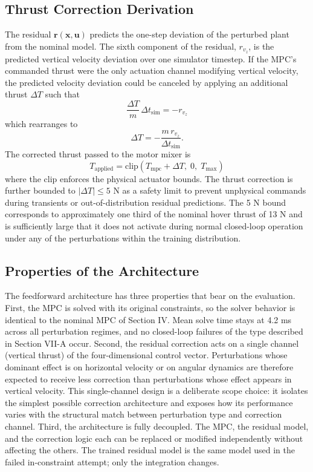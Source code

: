 \documentclass[conference]{IEEEtran}
\begin{document}
\subsection{Thrust Correction Derivation}
The residual $\mathbf{r}(\mathbf{x}, \mathbf{u})$ predicts the one-step deviation of the perturbed plant from the nominal model. The sixth component of the residual, $r_{v_z}$, is the predicted vertical velocity deviation over one simulator timestep. If the MPC's commanded thrust were the only actuation channel modifying vertical velocity, the predicted velocity deviation could be canceled by applying an additional thrust $\Delta T$ such that
\begin{equation}
\frac{\Delta T}{m}\, \Delta t_{\text{sim}} = -r_{v_z}
\end{equation}
which rearranges to
\begin{equation}
\Delta T = -\frac{m\, r_{v_z}}{\Delta t_{\text{sim}}}.
\end{equation}
The corrected thrust passed to the motor mixer is
\begin{equation}
T_{\text{applied}} = \mathrm{clip}\!\left(T_{\text{mpc}} + \Delta T,\; 0,\; T_{\max}\right)
\end{equation}
where the clip enforces the physical actuator bounds. The thrust correction is further bounded to $|\Delta T| \leq 5$ N as a safety limit to prevent unphysical commands during transients or out-of-distribution residual predictions. The 5 N bound corresponds to approximately one third of the nominal hover thrust of 13 N and is sufficiently large that it does not activate during normal closed-loop operation under any of the perturbations within the training distribution.

\subsection{Properties of the Architecture}
The feedforward architecture has three properties that bear on the evaluation. First, the MPC is solved with its original constraints, so the solver behavior is identical to the nominal MPC of Section IV. Mean solve time stays at 4.2 ms across all perturbation regimes, and no closed-loop failures of the type described in Section VII-A occur. Second, the residual correction acts on a single channel (vertical thrust) of the four-dimensional control vector. Perturbations whose dominant effect is on horizontal velocity or on angular dynamics are therefore expected to receive less correction than perturbations whose effect appears in vertical velocity. This single-channel design is a deliberate scope choice: it isolates the simplest possible correction architecture and exposes how its performance varies with the structural match between perturbation type and correction channel. Third, the architecture is fully decoupled. The MPC, the residual model, and the correction logic each can be replaced or modified independently without affecting the others. The trained residual model is the same model used in the failed in-constraint attempt; only the integration changes.
\end{document}
